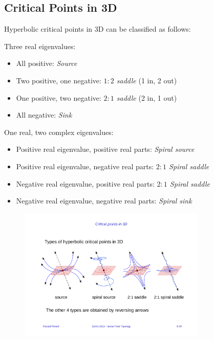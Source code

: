 \subsection{Critical Points in 3D}
Hyperbolic critical points in 3D can be classified as follows:
\begin{description}
    \item Three real eigenvalues:
        \begin{itemize}
            \item All positive: \emph{Source}
            \item Two positive, one negative: 
            \emph{$1:2$ saddle} (1 in, 2 out)
            \item One positive, two negative: 
            \emph{$2:1$ saddle} (2 in, 1 out)
            \item All negative: \emph{Sink}
        \end{itemize}
    \item One real, two complex eigenvalues:
        \begin{itemize}
            \item Positive real eigenvalue, positive real parts: \emph{Spiral source}
            \item Positive real eigenvalue, negative real parts: \emph{$2:1$ Spiral saddle}
            \item Negative real eigenvalue, positive real parts: \emph{$2:1$ Spiral saddle}
            \item Negative real eigenvalue, negative real parts: \emph{Spiral sink}
        \end{itemize}

\end{description}

\begin{figure}
    \centering
    \includegraphics[width=0.8\textwidth]{img/08_3d_critical_points}
\end{figure}


